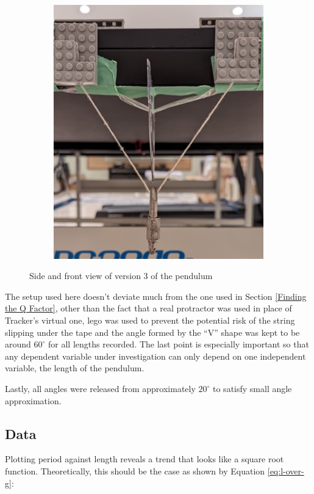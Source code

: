 \documentclass[12pt]{article}
\begin{document}
{\begin{figure}[!hptb]
\begin{subfigure}{0.49\textwidth}
        \includegraphics[width=\textwidth]{../figures/exp_setup3_front.png}
    \end{subfigure}
    \caption{Side and front view of version 3 of the pendulum}
    \label{fig:figure 5}
\end{figure}

The setup used here doesn't deviate much from the one used in Section \ref{Finding the Q Factor}, other than the fact that a real protractor was used in place of Tracker's virtual one, lego was used to prevent the potential risk of the string slipping under the tape and the angle formed by the ``V'' shape was kept to be around $60^\circ$ for all lengths recorded. The last point is especially important so that any dependent variable under investigation can only depend on one independent variable, the length of the pendulum.

Lastly, all angles were released from approximately $20^\circ$ to satisfy small angle approximation.

\subsection{Data}
Plotting period against length reveals a trend that looks like a square root function. Theoretically, this should be the case as shown by Equation \ref{eq:l-over-g}:

}
\end{document}
